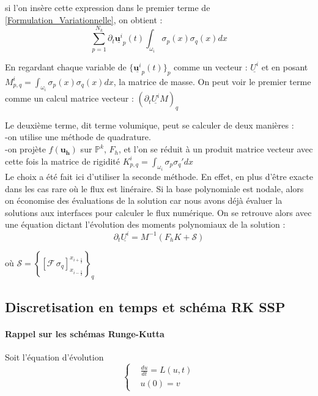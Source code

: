 si l'on insère cette expression dans le premier terme de \eqref{Formulation_Variationnelle}, on obtient : 
\begin{equation}
    \sum_{p=1}^{N_k} \partial_t \underline{\mathbf{u}^i}_p(t) \int_{\omega_i} \sigma_p(x) \sigma_q(x)dx  
\end{equation}

\noindent
En regardant chaque variable de $ \{\underline{\mathbf{u}^i}_p(t) \}_p$ comme un vecteur : $\underline{U^i}$ et en posant $M^i_{p,q} = \int_{\omega_i} \sigma_p(x) \sigma_q(x) dx$, la matrice de masse. 
On peut voir le premier terme comme un calcul matrice vecteur : $(\partial_t \underline{U^i} M)_q$

Le deuxième terme, dit terme volumique, peut se calculer de deux manières : \\
-on utilise une méthode de quadrature.\\
-on projète $f(\mathbf{u_h})$ sur $\mathbb{P}^k$, $F_h$, et l'on se réduit à un produit matrice vecteur avec cette fois la matrice de rigidité $K^i_{p,q} = \int_{\omega_i}  \sigma_p \sigma_q' dx $\\
Le choix a été fait ici d'utiliser la seconde méthode. 
En effet, en plus d'être exacte dans les cas rare où le flux est linéraire. 
Si la base polynomiale est nodale, alors on économise des évaluations de la solution car nous avons déjà évaluer la solutions aux interfaces pour calculer le flux numérique.
On se retrouve alors avec une équation dictant l'évolution des moments polynomiaux de la solution : 
\begin{equation}
    \partial_t \underline{U^i}= M^{-1} (F_h K + \mathcal{S})
\end{equation}

où $ \mathcal{S} = \left\{ \left[ \mathcal{F}\, \sigma_q \right]_{x_{i-\frac{1}{2}}}^{x_{i+\frac{1}{2}}} \right\}_q $ 

\subsection{Discretisation en temps et schéma RK SSP}

\paragraph{Rappel sur les schémas Runge-Kutta}
Soit l'équation d'évolution 
\begin{equation}
    \left\{
    \begin{aligned}
    &\frac{du}{dt} = L(u,t) \\
    &u(0) = v
    \end{aligned}
    \right.
\end{equation}

